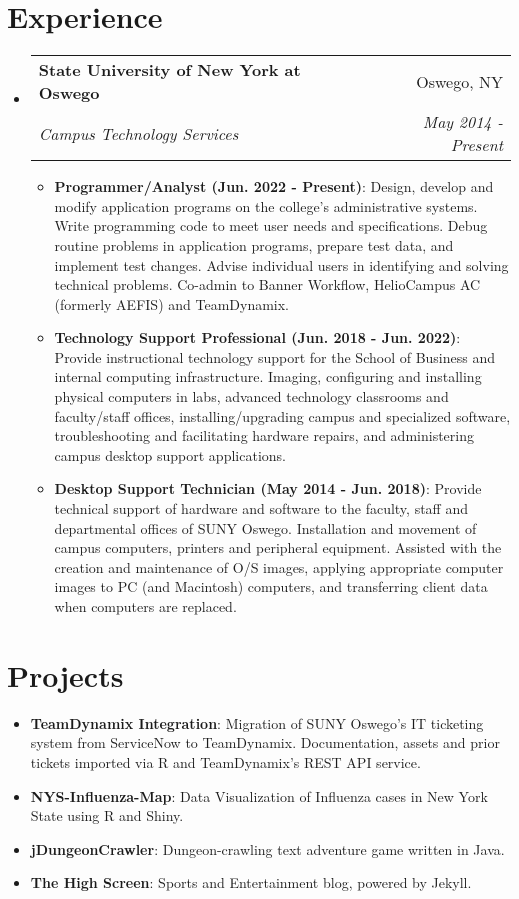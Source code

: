 \documentclass[letterpaper,11pt]{article}
\makeatletter
\newcommand{\resumeItem}[2]{
  \item\small{
    \textbf{#1}{: #2 \vspace{-2pt}}
  }
}
\newcommand{\resumeSubheading}[4]{
  \vspace{-1pt}\item
    \begin{tabular*}{0.97\textwidth}[t]{l@{\extracolsep{\fill}}r}
      \textbf{#1} & #2 \\
      \textit{\small#3} & \textit{\small #4} \\
    \end{tabular*}\vspace{-5pt}
}
\newcommand{\resumeSubItem}[2]{\resumeItem{#1}{#2}\vspace{-4pt}}
\newcommand{\resumeSubHeadingListStart}{\begin{itemize}[leftmargin=*]}
\newcommand{\resumeSubHeadingListEnd}{\end{itemize}}
\newcommand{\resumeItemListStart}{\begin{itemize}}
\newcommand{\resumeItemListEnd}{\end{itemize}\vspace{-5pt}}
\makeatother
\begin{document}
\section{Experience}
  	\resumeSubHeadingListStart
    	\resumeSubheading
      		{State University of New York at Oswego}{Oswego, NY}
      		{Campus Technology Services}{May 2014 - Present}
      		\resumeItemListStart
				\resumeItem{Programmer/Analyst (Jun. 2022 - Present)}
				{Design, develop and modify application programs on the college's administrative systems. Write programming code to meet user needs and specifications. Debug routine problems in application programs, prepare test data, and implement test changes. Advise individual users in identifying and solving technical problems. Co-admin to Banner Workflow, HelioCampus AC (formerly AEFIS) and TeamDynamix.}
				\resumeItem{Technology Support Professional (Jun. 2018 - Jun. 2022)}
				{Provide instructional technology support for the School of Business and internal computing infrastructure. Imaging, configuring and installing physical computers in labs, advanced technology classrooms and faculty/staff offices, installing/upgrading campus and specialized software,  troubleshooting and facilitating hardware repairs, and administering campus desktop support applications.}
				\resumeItem{Desktop Support Technician (May 2014 - Jun. 2018)}
				{Provide technical support of hardware and software to the faculty, staff and departmental offices of SUNY Oswego. Installation and movement of campus computers, printers and peripheral equipment. Assisted with the creation and maintenance of O/S images, applying appropriate computer images to PC (and Macintosh) computers, and transferring client data when computers are replaced.}
      		\resumeItemListEnd
	\resumeSubHeadingListEnd
	
\section{Projects}
  	\resumeSubHeadingListStart
	  	\resumeSubItem{TeamDynamix Integration}{Migration of SUNY Oswego's IT ticketing system from ServiceNow to TeamDynamix. Documentation, assets and prior tickets imported via R and TeamDynamix's REST API service.}
   		\resumeSubItem{NYS-Influenza-Map}{Data Visualization of Influenza cases in New York State using R and Shiny.}
   		\resumeSubItem{jDungeonCrawler}{Dungeon-crawling text adventure game written in Java.}
    	\resumeSubItem{The High Screen}{Sports and Entertainment blog, powered by Jekyll.}
  	\resumeSubHeadingListEnd
\end{document}

